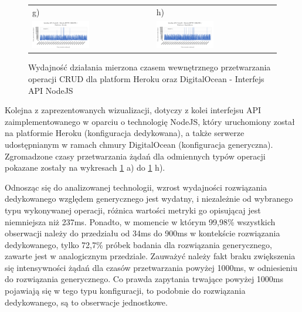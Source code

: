 \begin{figure}[H]
\begin{tabular}{@{}ll@{}}
    g) & h) \\
    \includegraphics[width=0.49\textwidth]{rys05/nodejs-delete-heroku.pdf} & \includegraphics[width=0.49\textwidth]{rys05/nodejs-delete-digitalocean.pdf} \\
	\end{tabular}
  \caption{Wydajność działania mierzona czasem wewnętrznego przetwarzania operacji CRUD dla platform Heroku oraz DigitalOcean - Interfejs API NodeJS}
  \label{fig:nodejs-heroku-vs-digitalocean}
\end{figure}

Kolejna z zaprezentowanych wizualizacji, dotyczy z kolei interfejsu API zaimplementowanego w oparciu o technologię NodeJS, który uruchomiony został na platformie Heroku (konfiguracja dedykowana), a także serwerze udostępnianym w ramach chmury DigitalOcean (konfiguracja generyczna). Zgromadzone czasy przetwarzania żądań dla odmiennych typów operacji pokazane zostały na wykresach \ref{fig:nodejs-heroku-vs-digitalocean} a) do \ref{fig:nodejs-heroku-vs-digitalocean} h).

Odnosząc się do analizowanej technologii, wzrost wydajności rozwiązania dedykowanego względem generycznego jest wydatny, i niezależnie od wybranego typu wykonywanej operacji, różnica wartości metryki go opisującaj jest niemniejsza niż 237ms. Ponadto, w momencie w którym 99,98\% wszystkich obserwacji należy do przedziału od 34ms do 900ms w kontekście rozwiązania dedykowanego, tylko 72,7\% próbek badania dla rozwiązania generycznego, zawarte jest w analogicznym przedziale. Zauważyć należy fakt braku zwiększenia się intensywności żądań dla czasów przetwarzania powyżej 1000ms, w odniesieniu do rozwiązania generycznego. Co prawda zapytania trwające powyżej 1000ms pojawiają się w tego typu konfiguracji, to podobnie do rozwiązania dedykowanego, są to obserwacje jednostkowe.  

